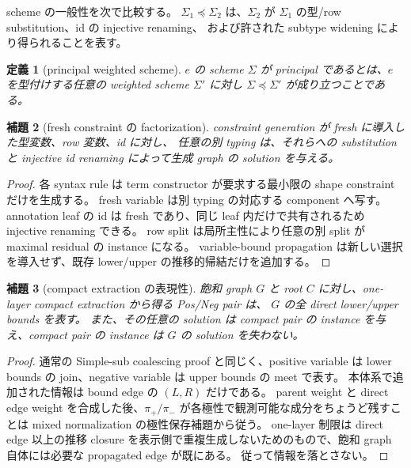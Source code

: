\documentclass[uplatex,dvipdfmx,a4paper,10.5pt]{jsarticle}
\theoremstyle{jpplain}
\newtheorem{definition}{定義}[section]
\newtheorem{lemma}[definition]{補題}
\newcommand{\projp}{\pi_{+}}
\newcommand{\projn}{\pi_{-}}
\begin{document}
scheme の一般性を次で比較する。
$\Sigma_1\preceq\Sigma_2$ は、$\Sigma_2$ が $\Sigma_1$ の型/row substitution、id の injective renaming、
および許された subtype widening により得られることを表す。

\begin{definition}[principal weighted scheme]
$e$ の scheme $\Sigma$ が principal であるとは、$e$ を型付けする任意の weighted scheme $\Sigma'$ に対し
$\Sigma\preceq\Sigma'$ が成り立つことである。
\end{definition}

\begin{lemma}[fresh constraint の factorization]
constraint generation が fresh に導入した型変数、row 変数、id に対し、
任意の別 typing は、それらへの substitution と injective id renaming によって生成 graph の solution を与える。
\end{lemma}

\begin{proof}
各 syntax rule は term constructor が要求する最小限の shape constraint だけを生成する。
fresh variable は別 typing の対応する component へ写す。
annotation leaf の id は fresh であり、同じ leaf 内だけで共有されるため injective renaming できる。
row split は局所主性により任意の別 split が maximal residual の instance になる。
variable-bound propagation は新しい選択を導入せず、既存 lower/upper の推移的帰結だけを追加する。
\end{proof}

\begin{lemma}[compact extraction の表現性]
飽和 graph $G$ と root $C$ に対し、one-layer compact extraction から得る Pos/Neg pair は、
$G$ の全 direct lower/upper bounds を表す。
また、その任意の solution は compact pair の instance を与え、compact pair の instance は $G$ の solution を失わない。
\end{lemma}

\begin{proof}
通常の Simple-sub coalescing proof と同じく、positive variable は lower bounds の join、negative variable は upper bounds の meet で表す。
本体系で追加された情報は bound edge の $(L,R)$ だけである。
parent weight と direct edge weight を合成した後、$\projp/\projn$ が各極性で観測可能な成分をちょうど残すことは mixed normalization の極性保存補題から従う。
one-layer 制限は direct edge 以上の推移 closure を表示側で重複生成しないためのもので、飽和 graph 自体には必要な propagated edge が既にある。
従って情報を落とさない。
\end{proof}
\end{document}
